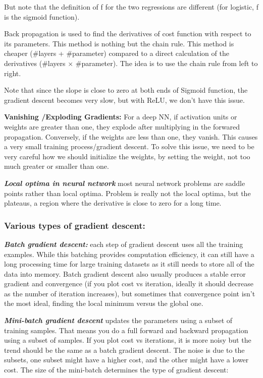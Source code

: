 \documentclass[12pt]{report}
\begin{document}
But note that the definition of f for the two regressions are different (for logistic, f is the sigmoid function).

Back propagation is used to find the derivatives of cost function with respect to its parameters. This method is nothing but the chain rule. This method is cheaper (\#layers + \#parameter) compared to a direct calculation of the derivatives (\#layers $\times$ \#parameter). The idea is to use the chain rule from left to right.

Note that since the slope is close to zero at both ends of Sigmoid function, the gradient descent becomes very slow, but with ReLU, we don't have this issue.


\textbf{Vanishing /Exploding Gradients:}
For a deep NN, if activation units or weights are greater than one, they explode after multiplying in the forwared propagation. Conversely, if the weights are less than one, they vanish. This causes a very small training process/gradient descent. To solve this issue, we need to be very careful how we should initialize the weights, by setting the weight, not too much greater or smaller than one.

\textbf{\textit{Local optima in neural network}} most neural network problems are saddle points rather than local optima. Problem is really not the local optima, but the plateaus, a region where the derivative is close to zero for a long time.


\subsubsection{Various types of gradient descent:}
\textbf{\textit{Batch gradient descent:}} each step of gradient descent uses all the training examples. While this batching provides computation efficiency, it can still have a long processing time for large training datasets as it still needs to store all of the data into memory. Batch gradient descent also usually produces a stable error gradient and convergence (if you plot cost vs iteration, ideally it should decrease as the number of iteration increases), but sometimes that convergence point isn't the most ideal, finding the local minimum versus the global one.

\textbf{\textit{Mini-batch gradient descent}} updates the parameters using a subset of training samples. That means you do a full forward and backward propagation using a subset of samples. If you plot cost vs iterations, it is more noisy but the trend should be the same as a batch gradient descent. The noise is due to the subsets, one subset might have a higher cost, and the other might have a lower cost. The size of the mini-batch determines the type of gradient descent:
\end{document}
